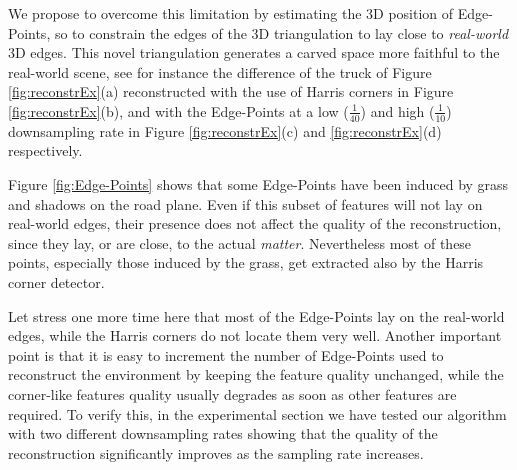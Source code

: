We propose to overcome this limitation by estimating the 3D position of Edge-Points, so to constrain the edges of the 3D triangulation to lay close to \emph{real-world} 3D edges. 
This novel triangulation generates a carved space more faithful to the real-world scene, see for instance the difference of the truck of Figure \ref{fig:reconstrEx}(a) reconstructed with the use of Harris corners in Figure \ref{fig:reconstrEx}(b), and with the Edge-Points at a low ($\frac{1}{40}$) and high ($\frac{1}{10}$) downsampling rate  in Figure \ref{fig:reconstrEx}(c) and \ref{fig:reconstrEx}(d) respectively. 

Figure \ref{fig:Edge-Points} shows that some Edge-Points have been induced by grass and shadows on the road plane. Even if this subset of features will not lay on real-world edges, their presence does not affect the quality of the reconstruction, since they lay, or are close, to the actual \emph{matter}.
Nevertheless most of these points, especially those induced by the grass, get extracted also by the Harris corner detector. 

Let stress one more time here that most of the Edge-Points lay on the real-world edges, while the Harris corners do not locate them very well.
Another important point is that it is easy to increment the number of Edge-Points used to reconstruct the environment by keeping the feature quality unchanged, while the corner-like features quality usually degrades as soon as other features are required. 
To verify this, in the experimental section we have tested our algorithm with two different downsampling rates showing that the quality of the reconstruction significantly improves as the sampling rate increases. 


